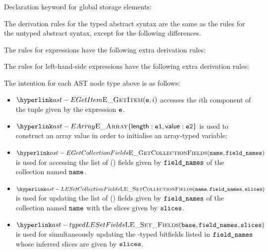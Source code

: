 



Declaration keyword for global storage elements:



The derivation rules for the typed abstract syntax are the same as the rules for the untyped abstract syntax,
except for the following differences.

The rules for expressions have the following extra derivation rules:

The rules for left-hand-side expressions have the following extra derivation rules:

The intention for each AST node type above is as follows:
\begin{itemize}
  \item $\EGetItem(\ve, i)$ accesses the $i$th component of the tuple given by
    the expression $\texttt{e}$.
  \item $\EArray\{\EArrayLength: \veone, \EArrayValue: \vetwo\}$ is used to
    construct an array value in order to initialise an array-typed variable;
  \item $\EGetCollectionFields(\name, \fieldnames)$ is used for accessing
    the list of (\bitvectortypeterm{}) fields given by $\texttt{field\_names}$
    of the collection named $\texttt{name}$.
  \item $\LESetCollectionFields(\name, \fieldnames, \vslices)$ is used for updating
    the list of (\bitvectortypeterm{}) fields given by $\texttt{field\_names}$ of the
    collection named $\texttt{name}$ with the slices given by $\texttt{slices}$.
  \item $\typedLESetFields(\vbase, \fieldnames, \vslices)$ is used for simultaneously updating
     the \bitvectortypeterm{}-typed bitfields listed in $\texttt{field\_names}$ whose inferred slices
     are given by $\texttt{slices}$.
\end{itemize}

